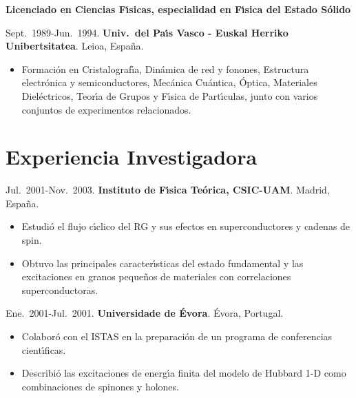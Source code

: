 \documentclass{article}
\begin{document}
\medskip
{\bf Licenciado en Ciencias F\'{\i}sicas, especialidad en F\'{\i}sica del Estado S\'{o}lido}

\medskip
Sept.~1989-Jun.~1994. 
{\bf Univ.\ del Pa\'{\i}s Vasco - Euskal Herriko Unibertsitatea}. Leioa, Espa\~na.

\begin{itemize}\itemsep 0pt
\item Formaci\'on en Cristalograf\'{\i}a, Din\'{a}mica de red y fonones, 
Estructura electr\'{o}nica y semiconductores, Mec\'{a}nica Cu\'{a}ntica, \'Optica, Materiales Diel\'{e}ctricos, Teor\'{\i}a de Grupos y F\'{\i}sica de Part\'{\i}culas, junto con varios conjuntos de experimentos relacionados.
\end{itemize}


\section*{Experiencia Investigadora}

Jul.~2001-Nov.~2003. 
{\bf Instituto de F\'{\i}sica Te\'orica, CSIC-UAM}. 
Madrid, Espa\~na. 

\begin{itemize}\itemsep 0pt
\item Estudi\'o el flujo c\'{\i}clico del RG y sus efectos en 
superconductores y cadenas de spin.

\item Obtuvo las principales caracter\'{\i}sticas del estado fundamental 
y las excitaciones en granos peque\~nos de materiales con correlaciones 
superconductoras.
\end{itemize}


Ene.~2001-Jul.~2001. {\bf Universidade de \'Evora}. \'Evora, Portugal.

\begin{itemize}\itemsep 0pt
\item Colabor\'o con el ISTAS en la preparaci\'on de un programa de 
conferencias cient\'{\i}ficas.

\item Describi\'{o} las excitaciones de energ\'{\i}a finita del modelo 
de Hubbard 1-D como combinaciones de spinones y holones.
\end{itemize}
\end{document}
